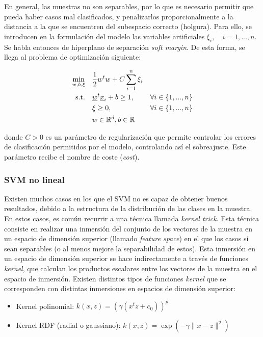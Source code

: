 \documentclass[12pt,a4paper,]{book}
\providecommand{\tightlist}{%
  \setlength{\itemsep}{0pt}\setlength{\parskip}{0pt}}
\numberwithin{dummy}{section}
\theoremstyle{ocrenumbox}
\theoremstyle{blacknumex}
\theoremstyle{blacknumbox}
\theoremstyle{ocrenum}
\theoremstyle{ocrenum}
\begin{document}
En general, las muestras no son separables, por lo que es necesario
permitir que pueda haber casos mal clasificados, y penalizarlos
proporcionalmente a la distancia a la que se encuentren del subespacio
correcto (holgura). Para ello, se introducen en la formulación del
modelo las variables artificiales \(\xi_i,\quad i=1,...,n\). Se habla
entonces de hiperplano de separación \emph{soft margin}. De esta forma,
se llega al problema de optimización siguiente:

\begin{equation}
\begin{aligned}
\min_{w,b,\xi} \quad & \frac{1}{2}w^{t}w+C\sum_{i=1}^{n}{\xi_{i}}\\
\textrm{s.t.} \quad & \underline w^t \underline x_i+b \ge 1, \quad & \forall i\in \{1,...,n\}\\
  &\xi\geq0,   \quad & \forall i\in \{1,...,n\} \\
  & w \in \mathbb{R}^d, \space b \in \mathbb{R} \\
\end{aligned}
\end{equation}

donde \(C>0\) es un parámetro de regularización que permite controlar
los errores de clasificación permitidos por el modelo, controlando así
el sobreajuste. Este parámetro recibe el nombre de coste (\emph{cost}).

\hypertarget{svm-no-lineal}{%
\subsubsection{SVM no lineal}\label{svm-no-lineal}}

Existen muchos casos en los que el SVM no es capaz de obtener buenos
resultados, debido a la estructura de la distribución de las clases en
la muestra. En estos casos, es común recurrir a una técnica llamada
\emph{kernel trick}. Esta técnica consiste en realizar una inmersión del
conjunto de los vectores de la muestra en un espacio de dimensión
superior (llamado \emph{feature space}) en el que los casos sí sean
separables (o al menos mejore la separabilidad de estos). Esta inmersión
en un espacio de dimensión superior se hace indirectamente a través de
funciones \emph{kernel}, que calculan los productos escalares entre los
vectores de la muestra en el espacio de inmersión. Existen distintos
tipos de funciones \emph{kernel} que se corresponden con distintas
inmersiones en espacios de dimensión superior:

\begin{itemize}
\tightlist
\item
  Kernel polinomial: \(k(x,z) = \left( \gamma(x^tz + c_0) \right)^p\)
\item
  Kernel RDF (radial o gaussiano): \(k(x,z) = \exp(-\gamma \| x-z\|^2)\)
\end{itemize}
\end{document}
